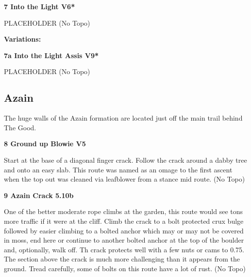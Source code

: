\begin{multicols}{2}
		
			
			\needspace{1.5cm}
\label{rt:Into the Light}
\colorbox{RoyalBlue!20}{
\parbox{0.95\linewidth}{
\textbf{
7 Into the Light V6*  
}}}

			\begin{adjustwidth}{0.5cm}{}			
			PLACEHOLDER (No Topo)
			\end{adjustwidth}
			
				\begin{adjustwidth}{0.5cm}{}				
				\needspace{3cm}
				\textbf{Variations:} \newline
					
					\needspace{1.5cm}
\label{vr:Into the Light Assis}
\colorbox{Goldenrod!50}{
\parbox{0.95\linewidth}{
\textbf{
7a Into the Light Assis V9*  
}}}

					\begin{adjustwidth}{0.5cm}{}			
					PLACEHOLDER (No Topo)
					\end{adjustwidth}
					
					
				\end{adjustwidth}
			
		
		
		\needspace{1.5cm}
		\subsection*{Azain}\label{bf:Azain}
		The huge walls of the Azain formation are located just off the main trail behind The Good.\\
	
		
			
			\needspace{1.5cm}
\label{rt:Ground up Blowie}
\colorbox{RoyalBlue!20}{
\parbox{0.95\linewidth}{
\textbf{
8 Ground up Blowie V5  
}}}

			\begin{adjustwidth}{0.5cm}{}			
			Start at the base of a diagonal finger crack. Follow the crack around a dabby tree and onto an easy slab. This route was named as an omage to the first ascent when the top out was cleaned via leafblower from a stance mid route. (No Topo)
			\end{adjustwidth}
			
			
			
			\needspace{1.5cm}
\label{rt:Azain Crack}
\colorbox{RoyalBlue!20}{
\parbox{0.95\linewidth}{
\textbf{
9 Azain Crack 5.10b  
}}}

			\begin{adjustwidth}{0.5cm}{}			
			One of the better moderate rope climbs at the garden, this route would see tons more traffic if it were at the cliff. Climb the crack to a bolt protected crux bulge followed by easier climbing to a bolted anchor which may or may not be covered in moss, end here or continue to another bolted anchor at the top of the boulder and, optionally, walk off. Th crack protects well with a few nuts or cams to 0.75. The section above the crack is much more challenging than it appears from the ground. Tread carefully, some of bolts on this route have a lot of rust. (No Topo)
			\end{adjustwidth}
			

\end{multicols}

